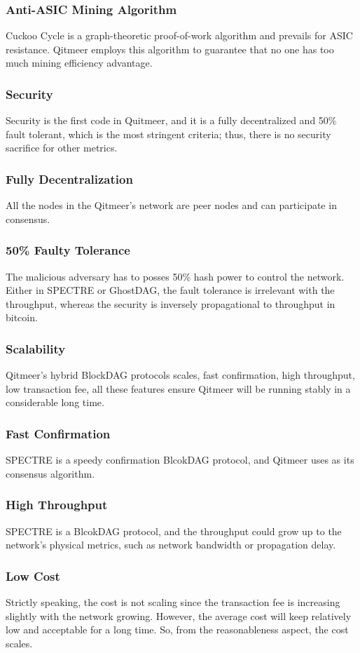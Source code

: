 \documentclass[a4paper,11pt]{article}
\begin{document}
\subsubsection*{Anti-ASIC Mining Algorithm}
Cuckoo Cycle is a graph-theoretic proof-of-work algorithm and prevails for ASIC resistance. Qitmeer employs this algorithm to guarantee that no one has too much mining efficiency advantage.
\subsubsection{Security}
Security is the first code in Quitmeer, and it is a fully decentralized and 50\% fault tolerant, which is the most stringent criteria; thus, there is no security sacrifice for other metrics. 
\subsubsection*{Fully Decentralization}
All the nodes in the Qitmeer's network are peer nodes and can participate in consensus.
\subsubsection*{50\% Faulty Tolerance}
The malicious adversary has to posses 50\% hash power to control the network. Either in SPECTRE or GhostDAG, the fault tolerance is irrelevant with the throughput, whereas the security is inversely propagational to throughput in bitcoin.

\subsubsection{Scalability}

Qitmeer's hybrid BlockDAG protocols scales, fast confirmation, high throughput, low transaction fee, all these features ensure Qitmeer will be running stably in a considerable long time.
\subsubsection*{Fast Confirmation}
SPECTRE is a speedy confirmation BlcokDAG protocol, and Qitmeer uses as its consensus algorithm.
\subsubsection*{High Throughput}
SPECTRE is a BlcokDAG protocol, and the throughput could grow up to the network's physical metrics, such as network bandwidth or propagation delay.
\subsubsection*{Low Cost}
Strictly speaking, the cost is not scaling since the transaction fee is increasing slightly with the network growing. However, the average cost will keep relatively low and acceptable for a long time. So, from the reasonableness aspect, the cost scales.
\end{document}

